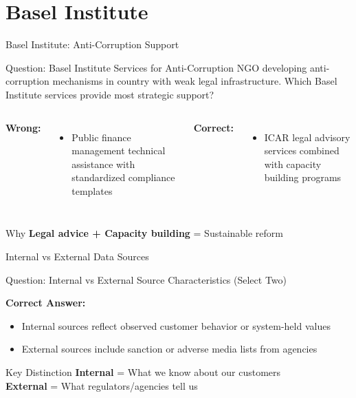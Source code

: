 \documentclass{beamer}
\begin{document}
\section{Basel Institute}
\begin{frame}{Basel Institute: Anti-Corruption Support}
\begin{block}{Question: Basel Institute Services for Anti-Corruption}
\small{NGO developing anti-corruption mechanisms in country with weak legal infrastructure. Which Basel Institute services provide most strategic support?}
\end{block}

\begin{columns}
\textcolor{wrong}{\textbf{ Wrong:}}
\begin{itemize}
    \item Public finance management technical assistance with standardized compliance templates
\end{itemize}

\textcolor{correct}{\textbf{Correct:}}
\begin{itemize}
    \item ICAR legal advisory services combined with capacity building programs
\end{itemize}
\end{columns}

\begin{block}{Why}
\textbf{Legal advice + Capacity building} = Sustainable reform
\end{block}
\end{frame}

\begin{frame}{Internal vs External Data Sources}
\begin{block}{Question: Internal vs External Source Characteristics (Select Two)}
\end{block}

\vspace{0.3cm}
\textcolor{correct}{\textbf{Correct Answer:}}
\begin{itemize}
    \item Internal sources reflect observed customer behavior or system-held values
    \item External sources include sanction or adverse media lists from agencies
\end{itemize}

\begin{block}{Key Distinction}
\textbf{Internal} = What we know about our customers \\
\textbf{External} = What regulators/agencies tell us
\end{block}
\end{frame}
\end{document}
